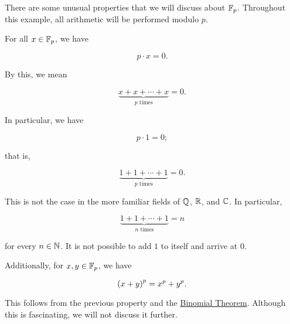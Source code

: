 \begin{example}
There are some unusual properties that we will discuss about $\mathbb{F}_{p}$.
Throughout this example, all arithmetic will be performed modulo $p$.

For all $x\in\mathbb{F}_{p}$, we have

\begin{equation}
    p\cdot x = 0.
\end{equation}

\noindent
By this, we mean

\begin{equation}
    \underbrace{x + x + \cdots + x}_{\text{$p$ times}} = 0.
\end{equation}

\noindent
In particular, we have

\begin{equation}
    p\cdot 1 = 0;
\end{equation}

\noindent
that is,

\begin{equation}
    \underbrace{1 + 1 + \cdots + 1}_{\text{$p$ times}} = 0.
\end{equation}

\noindent
This is not the case in the more familiar \glspl{field}
of $\mathbb{Q}$, $\mathbb{R}$, and $\mathbb{C}$.
In particular,

\begin{equation}
    \underbrace{1 + 1 + \cdots + 1}_{\text{$n$ times}} = n
\end{equation}

\noindent
for every $n\in\mathbb{N}$.
It is not possible to add $1$ to itself and arrive at $0$.

Additionally, for $x,y\in\mathbb{F}_{p}$, we have

\begin{equation}
    \left( x+y \right)^{p} = x^{p} + y^{p}.
\end{equation}

\noindent
This follows from the previous property and the
\href{https://en.wikipedia.org/wiki/Binomial_theorem}{Binomial Theorem}.
Although this is fascinating, we will not discuss it further.
\end{example}

